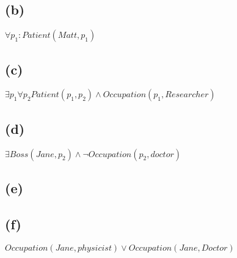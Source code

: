 \documentclass[a4paper]{scrartcl}
\begin{document}
\subsection*{(b)}
$\forall p_1 : Patient(Matt, p_1)$

\subsection*{(c)}
$\exists p_1 \forall p_2 Patient(p_1, p_2) \land Occupation(p_1, Researcher)$


\subsection*{(d)}
$\exists Boss(Jane, p_2) \land \neg Occupation(p_2, doctor)$


\subsection*{(e)}



\subsection*{(f)}
$Occupation(Jane, physicist) \lor Occupation(Jane, Doctor)$
\end{document}
